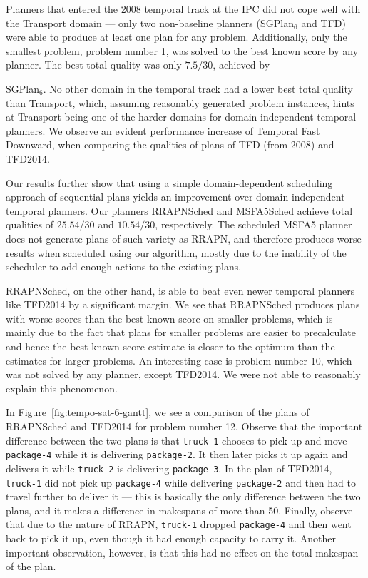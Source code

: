 Planners that entered the 2008 temporal track at the IPC did not cope well with the Transport domain
--- only two non-baseline planners (SGPlan$_6$ and TFD) were able to produce at least one plan
for any problem. Additionally, only the smallest problem, problem number 1, was solved
to the best known score by any planner.
The best total quality was only $7.5/30$, achieved by
{SGPlan$_6$. No other domain in the temporal track had a lower best total quality
than Transport, which, assuming reasonably generated problem instances, hints
at Transport being one of the harder domains for domain-independent temporal planners.
We observe an evident performance increase of Temporal Fast Downward,
when comparing the qualities of plans of TFD (from 2008) and TFD2014.

Our results further show that using a simple domain-dependent scheduling approach
of sequential plans yields an improvement over domain-independent temporal planners. Our planners RRAPNSched
and MSFA5Sched achieve total qualities of $25.54/30$
and $10.54/30$, respectively.
The scheduled MSFA5 planner does not generate plans of such variety as RRAPN,
and therefore produces worse results when scheduled using our algorithm,
mostly due to the inability of the scheduler to add enough 
actions to the existing plans.

RRAPNSched, on the other hand, is able to beat even newer temporal planners like TFD2014
by a significant margin.
We see that RRAPNSched produces plans with worse scores than the best known score on smaller problems, which is mainly due to the fact that plans for smaller problems are easier to precalculate and hence the best known score estimate is closer
to the optimum than the estimates for larger problems.
An interesting case is problem number 10,
which was not solved by any planner, except TFD2014. We were not able to reasonably explain
this phenomenon. 

In Figure~\ref{fig:tempo-sat-6-gantt}, we see a comparison of the plans
of RRAPNSched and TFD2014 for problem number 12.
Observe that the important difference between the two plans
is that \texttt{truck-1} chooses to pick up and move \texttt{package-4}
while it is delivering \texttt{package-2}. It then later picks it up again and delivers
it while \texttt{truck-2} is delivering \texttt{package-3}.
In the plan of TFD2014, \texttt{truck-1} did not pick up \texttt{package-4}
while delivering \texttt{package-2} and then had to travel further to deliver it
--- this is basically the only difference between the two plans,
and it makes a difference in makespans of more than 50.
Finally, observe that due to the nature of RRAPN, \texttt{truck-1}
dropped \texttt{package-4} and then went back to pick it up, even though it had enough capacity
to carry it. Another important observation, however, is that this had no effect on the total makespan
of the plan.

}
